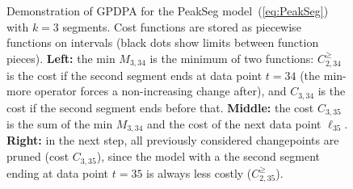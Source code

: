 \documentclass{article}
\begin{document}
\begin{figure}[t!]
  \centering
  
\vskip -0.5cm
  \caption{
    Demonstration of GPDPA for the PeakSeg model~(\ref{eq:PeakSeg})
    with $k=3$ segments. Cost functions are stored as piecewise
    functions on intervals (black dots show limits between function
    pieces). \textbf{Left:} the min \textcolor{Min}{$M_{3,34}$} is the
    minimum of two functions: \textcolor{MinMore}{$C^{\geq}_{2,34}$}
    is the cost if the second segment ends at data point $t=34$ (the
    min-more operator forces a non-increasing change after), and
    \textcolor{Ckt}{$C_{3,34}$} is the cost if the second segment ends
    before that. \textbf{Middle:} the cost \textcolor{Ckt}{$C_{3,35}$}
    is the sum of the min \textcolor{Min}{$M_{3,34}$} and the cost of
    the next data point \textcolor{Data}{$\ell_{35}$}. \textbf{Right:}
    in the next step, all previously considered changepoints are
    pruned (cost \textcolor{Ckt}{$C_{3,35}$}), since the model with a the second
    segment ending at data point $t=35$ is always less costly
    (\textcolor{MinMore}{$C^{\geq}_{2,35}$}).  }
  \label{fig:min-envelope}
\end{figure}
\end{document}
